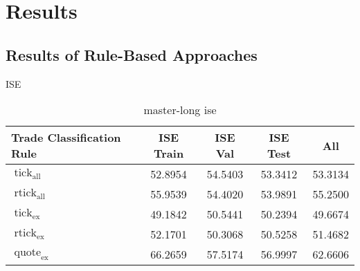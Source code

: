 \section{Results}\label{sec:results}

\subsection{Results of Rule-Based Approaches}\label{sec:result-of-rule-based-approaches}

\gls{ISE}
\begin{table}[H]
    \centering
    \caption[master-short]{master-long ise}
    \label{tab:ise_supervised_all-master}
    \begin{tabular}{@{}p{5.7cm}SSSS@{}}
        \toprule
        {Trade Classification Rule}                                                                                           & {\gls{ISE} Train} & {\gls{ISE} Val} & {\gls{ISE} Test} & {All}   \\\midrule
        $\operatorname{tick}_{\mathrm{all}}$                                                                                  & 52.8954           & 54.5403         & 53.3412          & 53.3134 \\
        $\operatorname{rtick}_{\mathrm{all}}$                                                                                 & 55.9539           & 54.4020         & 53.9891          & 55.2500 \\ \midrule
        $\operatorname{tick}_{\mathrm{ex}}$                                                                                   & 49.1842           & 50.5441         & 50.2394          & 49.6674 \\
        $\operatorname{rtick}_{\mathrm{ex}}$                                                                                  & 52.1701           & 50.3068         & 50.5258          & 51.4682 \\
        $\operatorname{quote}_{\mathrm{ex}}$                                                                                  & 66.2659           & 57.5174         & 56.9997          & 62.6606 \\

\end{tabular}
\end{table}
